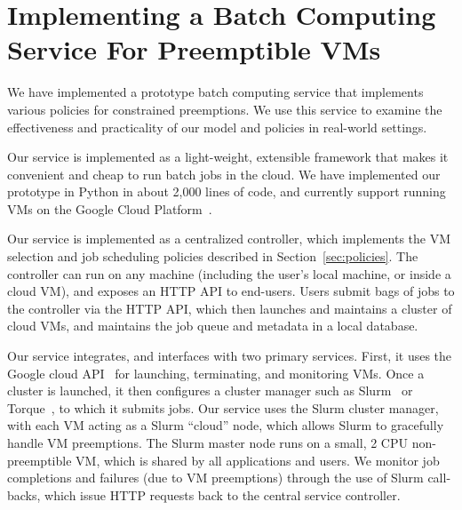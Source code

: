 \section{Implementing a Batch Computing Service For Preemptible VMs}
\label{sec:impl}

We have implemented a prototype batch computing service that implements various policies for constrained preemptions. 
We use this service to examine the effectiveness and practicality of our model and policies in real-world settings. 



Our service is implemented as a light-weight, extensible framework that makes it convenient and cheap to run batch jobs in the cloud. 
We have implemented our prototype in Python in about 2,000 lines of code, and currently support running VMs on the Google Cloud Platform~\cite{gcp}. 
%


Our service is implemented as a centralized controller, which implements the VM selection and job scheduling policies described in Section~\ref{sec:policies}. 
The controller can run on any machine (including the user's local machine, or inside a cloud VM), and exposes an HTTP API to end-users. 
Users submit bags of jobs to the controller via the HTTP API, which then launches and maintains a cluster of cloud VMs, and maintains the job queue and metadata in a local database. 

Our service integrates, and interfaces with two primary services.
First, it uses the Google cloud API~\cite{gcloud-api} for launching, terminating, and monitoring VMs.
Once a cluster is launched, it then configures a cluster manager such as Slurm~\cite{slurm} or Torque~\cite{torque}, to which it submits jobs. 
Our service uses the Slurm cluster manager, with each VM acting as a Slurm ``cloud'' node, which allows Slurm to gracefully handle VM preemptions.
The Slurm master node runs on a small, 2 CPU non-preemptible VM, which is shared by all applications and users. 
We monitor job completions and failures (due to VM preemptions) through the use of Slurm call-backs, which issue HTTP requests back to the central service controller. 


